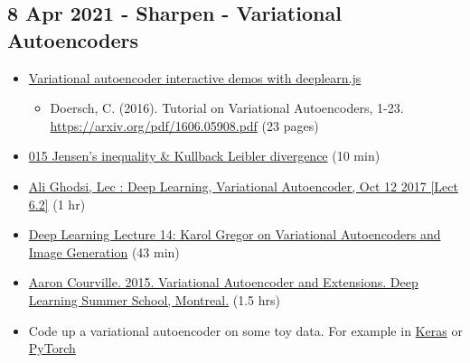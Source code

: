 \documentclass[11pt, oneside]{article}   	%
\begin{document}
\subsection{8 Apr 2021 - Sharpen - Variational Autoencoders }
\begin{itemize}
	\item \href{https://www.siarez.com/projects/variational-autoencoder}{Variational autoencoder interactive demos with deeplearn.js}
	\begin{itemize}
		\item Doersch, C. (2016). Tutorial on Variational Autoencoders, 1-23. \url{https://arxiv.org/pdf/1606.05908.pdf} (23 pages)
	\end{itemize}
	\item \href{https://youtu.be/_2PZxw4FzDU}{015 Jensen's inequality \& Kullback Leibler divergence} (10 min)
	\item \href{https://www.youtube.com/watch?v=uaaqyVS9-rM&feature=youtu.be}{Ali Ghodsi, Lec : Deep Learning, Variational Autoencoder, Oct 12 2017 [Lect 6.2]} (1 hr)
	\item \href{https://youtu.be/P78QYjWh5sM}{Deep Learning Lecture 14: Karol Gregor on Variational Autoencoders and Image Generation} (43 min)
	\item \href{http://videolectures.net/deeplearning2015_courville_autoencoder_extension/}{Aaron Courville. 2015. Variational Autoencoder and Extensions. Deep Learning Summer School, Montreal.} (1.5 hrs)
\end{itemize}
\begin{itemize}
	\item Code up a variational autoencoder on some toy data. For example in \href{https://tiao.io/post/tutorial-on-variational-autoencoders-with-a-concise-keras-implementation/}{Keras} or \href{https://towardsdatascience.com/variational-autoencoder-demystified-with-pytorch-implementation-3a06bee395ed}{PyTorch}
\end{itemize}
\end{document}
